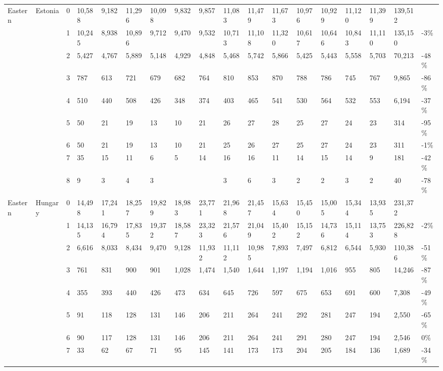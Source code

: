 \begin{longtable}{llllllllllllllllll}
  Eastern & Estonia & 0 & 10,588 & 9,182 & 11,296 & 10,098 & 9,832 & 9,857 & 11,083 & 11,479 & 11,673 & 10,976 & 10,929 & 11,120 & 11,399 & 139,512 &  \\ 
   &  & 1 & 10,245 & 8,938 & 10,896 & 9,712 & 9,470 & 9,532 & 10,713 & 11,108 & 11,320 & 10,617 & 10,646 & 10,843 & 11,110 & 135,150 & -3\% \\ 
   &  & 2 & 5,427 & 4,767 & 5,889 & 5,148 & 4,929 & 4,848 & 5,468 & 5,742 & 5,866 & 5,425 & 5,443 & 5,558 & 5,703 & 70,213 & -48\% \\ 
   &  & 3 & 787 & 613 & 721 & 679 & 682 & 764 & 810 & 853 & 870 & 788 & 786 & 745 & 767 & 9,865 & -86\% \\ 
   &  & 4 & 510 & 440 & 508 & 426 & 348 & 374 & 403 & 465 & 541 & 530 & 564 & 532 & 553 & 6,194 & -37\% \\ 
   &  & 5 & 50 & 21 & 19 & 13 & 10 & 21 & 26 & 27 & 28 & 25 & 27 & 24 & 23 & 314 & -95\% \\ 
   &  & 6 & 50 & 21 & 19 & 13 & 10 & 21 & 25 & 26 & 27 & 25 & 27 & 24 & 23 & 311 & -1\% \\ 
   &  & 7 & 35 & 15 & 11 & 6 & 5 & 14 & 16 & 16 & 11 & 14 & 15 & 14 & 9 & 181 & -42\% \\ 
   &  & 8 & 9 & 3 & 4 & 3 &  &  & 3 & 6 & 3 & 2 & 2 & 3 & 2 & 40 & -78\% \\ 
  Eastern & Hungary & 0 & 14,498 & 17,241 & 18,257 & 19,829 & 18,983 & 23,771 & 21,968 & 21,457 & 15,634 & 15,450 & 15,005 & 15,344 & 13,935 & 231,372 &  \\ 
   &  & 1 & 14,135 & 16,794 & 17,835 & 19,372 & 18,587 & 23,323 & 21,576 & 21,049 & 15,402 & 15,152 & 14,736 & 15,114 & 13,753 & 226,828 & -2\% \\ 
   &  & 2 & 6,616 & 8,033 & 8,434 & 9,470 & 9,128 & 11,932 & 11,112 & 10,985 & 7,893 & 7,497 & 6,812 & 6,544 & 5,930 & 110,386 & -51\% \\ 
   &  & 3 & 761 & 831 & 900 & 901 & 1,028 & 1,474 & 1,540 & 1,644 & 1,197 & 1,194 & 1,016 & 955 & 805 & 14,246 & -87\% \\ 
   &  & 4 & 355 & 393 & 440 & 426 & 473 & 634 & 645 & 726 & 597 & 675 & 653 & 691 & 600 & 7,308 & -49\% \\ 
   &  & 5 & 91 & 118 & 128 & 131 & 146 & 206 & 211 & 264 & 241 & 292 & 281 & 247 & 194 & 2,550 & -65\% \\ 
   &  & 6 & 90 & 117 & 128 & 131 & 146 & 206 & 211 & 264 & 241 & 291 & 280 & 247 & 194 & 2,546 & 0\% \\ 
   &  & 7 & 33 & 62 & 67 & 71 & 95 & 145 & 141 & 173 & 173 & 204 & 205 & 184 & 136 & 1,689 & -34\% \\ 

\end{longtable}
